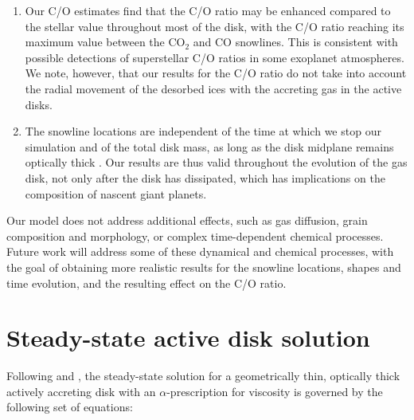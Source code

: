 \documentclass[apj]{emulateapj}
\begin{document}
\begin{enumerate}
\item Our C/O estimates find that the C/O ratio may be enhanced compared to the stellar value throughout most of the disk, with the C/O ratio reaching its maximum value between the CO$_2$ and CO snowlines. This is consistent with possible detections of superstellar C/O ratios in some exoplanet atmospheres. We note, however, that our results for the C/O ratio do not take into account the radial movement of the desorbed ices with the accreting gas in the active disks.

\item The snowline locations are independent of the time at which we stop our simulation and of the total disk mass, as long as the disk midplane remains optically thick . Our results are thus valid throughout the evolution of the gas disk, not only after the disk has dissipated, which has implications on the composition of nascent giant planets. 

\end{enumerate}

Our model does not address additional effects, such as gas diffusion, grain composition and morphology, or complex time-dependent chemical processes. Future work will address some of these dynamical and chemical processes, with the goal of obtaining more realistic results for the snowline locations, shapes and time evolution, and the resulting effect on the C/O ratio. %

\appendix
\section{Steady-state active disk solution} \label{app:steadystate}

Following \citet{shakura73} and \citet{armitage10}, the steady-state solution for a geometrically thin, optically thick actively accreting disk with an $\alpha$-prescription for viscosity is governed by the following set of equations:
\end{document}
